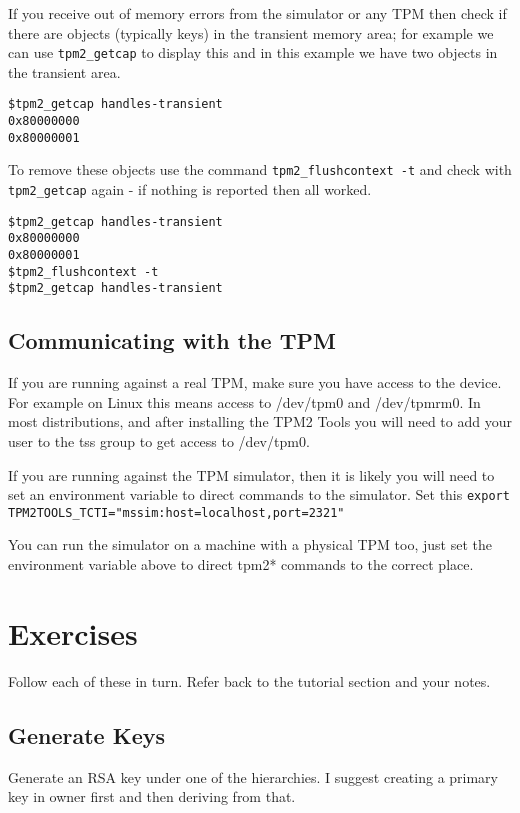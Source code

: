 \documentclass[11pt,a4paper]{article}
\begin{document}
If you receive out of memory errors from the simulator or any TPM then check if there are objects (typically keys) in the transient memory area; for example we can use \texttt{tpm2\_getcap} to display this and in this example we have two objects in the transient area.

\begin{verbatim}
$tpm2_getcap handles-transient
0x80000000
0x80000001
\end{verbatim}

To remove these objects use the command \texttt{tpm2\_flushcontext -t} and check with \texttt{tpm2\_getcap} again - if nothing is reported then all worked.

\begin{verbatim}
$tpm2_getcap handles-transient
0x80000000
0x80000001
$tpm2_flushcontext -t
$tpm2_getcap handles-transient
\end{verbatim}

\subsection{Communicating with the TPM}
If you are running against a real TPM, make sure you have access to the device. For example on Linux this means access to /dev/tpm0 and /dev/tpmrm0. In most distributions, and after installing the TPM2 Tools you will need to add your user to the tss group to get access to /dev/tpm0.

If you are running against the TPM simulator, then it is likely you will need to set an environment variable to direct commands to the simulator. Set this \texttt{export TPM2TOOLS\_TCTI="mssim:host=localhost,port=2321"}

You can run the simulator on a machine with a physical TPM too, just set the environment variable above to direct tpm2* commands to the correct place.

\section{Exercises}
Follow each of these in turn. Refer back to the tutorial section and your notes.

\subsection{Generate Keys}
Generate an RSA key under one of the hierarchies. I suggest creating a primary key in owner first and then deriving from that.
\end{document}
